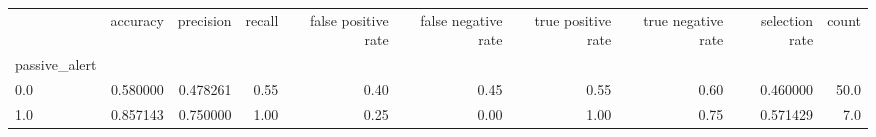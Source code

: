 \begin{tabular}{lrrrrrrrrr}
\toprule
{} &  accuracy &  precision &  recall &  false positive rate &  false negative rate &  true positive rate &  true negative rate &  selection rate &  count \\
passive\_alert &           &            &         &                      &                      &                     &                     &                 &        \\
\midrule
0.0           &  0.580000 &   0.478261 &    0.55 &                 0.40 &                 0.45 &                0.55 &                0.60 &        0.460000 &   50.0 \\
1.0           &  0.857143 &   0.750000 &    1.00 &                 0.25 &                 0.00 &                1.00 &                0.75 &        0.571429 &    7.0 \\
\bottomrule
\end{tabular}
